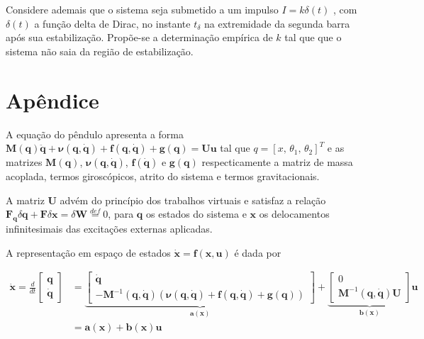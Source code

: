 \documentclass[a4paper, twoside]{article}
\begin{document}
    Considere ademais que o sistema seja submetido a um impulso $I = k \delta(t)$ \cite{Beer:2003:VME:1207649}, com $\delta(t)$ a função delta de Dirac, no instante $t_{\delta}$ na extremidade da segunda barra após sua estabilização. Propõe-se a determinação empírica de $k$ tal que que o sistema não saia da região de estabilização.  


\newpage

\section*{Apêndice}

A equação do pêndulo apresenta a forma $\mathbf{M}(\mathbf{q}) \mathbf{\ddot q} + \mathbf{\nu}(\mathbf{q}, \mathbf{\dot q}) + \mathbf{f}(\mathbf{q}, \mathbf{\dot q}) + \mathbf{g}(\mathbf{q}) = \mathbf{U} \mathbf{u}$ tal que $q = [x, \, \theta_1, \, \theta_2]^T$ e as matrizes $\mathbf{M}(\mathbf{q})$, $\mathbf{\nu(\mathbf{q}, \mathbf{\dot q})}$, $\mathbf{f}(\mathbf{\dot q})$ e $\mathbf{g}(\mathbf{q})$ respecticamente a matriz de massa acoplada, termos giroscópicos, atrito do sistema e termos gravitacionais. 

A matriz $\mathbf{U}$ advém do princípio dos trabalhos virtuais \cite{Beer:2003:VME:1207649} e satisfaz a relação $\mathbf{F_q} \delta{\mathbf{q}} + \mathbf{F}\delta \mathbf{x} = \delta \mathbf{W} \stackrel{def}{=} 0$, para $\mathbf{q}$ os estados do sistema e $\mathbf{x}$ os delocamentos infinitesimais das excitações externas aplicadas.

A representação em espaço de estados $\mathbf{\dot x} = \mathbf{f}(\mathbf{x}, \mathbf{u})$ é dada por
    
    \begin{equation}
        \begin{aligned}
            \mathbf{\dot x} = \frac{d}{dt} \begin{bmatrix} \mathbf{q} \\ \mathbf{\dot q} \end{bmatrix} &= 
            \underbrace{\begin{bmatrix}
                \mathbf{\dot q} \\
                - \mathbf{M}^{-1}(\mathbf{q}, \mathbf{\dot q})(\mathbf{\nu}(\mathbf{q}, \mathbf{\dot q}) + \mathbf{f}(\mathbf{q}, \mathbf{\dot q}) + \mathbf{g}(\mathbf{q}) )
            \end{bmatrix}}_{\mathbf{a}(\mathbf{x})} + 
            \underbrace{\begin{bmatrix} 
                0 \\ \mathbf{M}^{-1}(\mathbf{q}, \mathbf{\dot q}) \mathbf{U} 
            \end{bmatrix}}_{\mathbf{b}(\mathbf{x})} \mathbf{u} \\
            & = \mathbf{a}(\mathbf{x}) + \mathbf{b}(\mathbf{x})\mathbf{u}
        \end{aligned}
    \end{equation}
    
\end{document}
